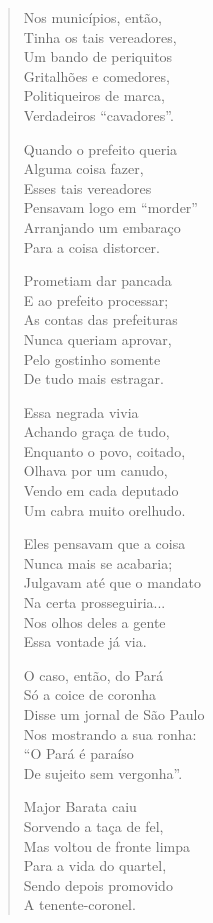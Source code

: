 \begin{verse}
Nos municípios, então,\\
Tinha os tais vereadores,\\
Um bando de periquitos\\
Gritalhões e comedores,\\
Politiqueiros de marca,\\
Verdadeiros “cavadores”.

Quando o prefeito queria\\
Alguma coisa fazer,\\
Esses tais vereadores\\
Pensavam logo em “morder”\\
Arranjando um embaraço\\
Para a coisa distorcer.

Prometiam dar pancada\\
E ao prefeito processar;\\
As contas das prefeituras\\
Nunca queriam aprovar,\\
Pelo gostinho somente\\
De tudo mais estragar.

Essa negrada vivia\\
Achando graça de tudo,\\
Enquanto o povo, coitado,\\
Olhava por um canudo,\\
Vendo em cada deputado\\
Um cabra muito orelhudo.


Eles pensavam que a coisa\\
Nunca mais se acabaria;\\
Julgavam até que o mandato\\
Na certa prosseguiria...\\
Nos olhos deles a gente\\
Essa vontade já via.

O caso, então, do Pará\\
Só a coice de coronha\\
Disse um jornal de São Paulo\\
Nos mostrando a sua ronha:\\
“O Pará é paraíso\\
De sujeito sem vergonha”.

Major Barata caiu\\
Sorvendo a taça de fel,\\
Mas voltou de fronte limpa\\
Para a vida do quartel,\\
Sendo depois promovido\\
A tenente-coronel.


\end{verse}
